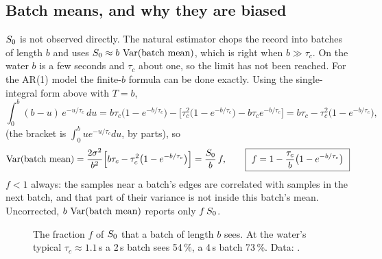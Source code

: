 \subsection{Batch means, and why they are biased}

$S_0$ is not observed directly. The natural estimator chops the record into
batches of length $b$ and uses $S_0 \approx b\,\operatorname{Var}(\text{batch mean})$, which
is right when $b \gg \tau_c$. On the water $b$ is a few seconds and $\tau_c$ about
one, so the limit has not been reached. For the AR(1) model the finite-$b$ formula
can be done exactly. Using the single-integral form above with $T=b$,
\[
  \int_0^b (b-u)\,e^{-u/\tau_c}\,du
  = b\tau_c\big(1-e^{-b/\tau_c}\big) - \Big[\tau_c^2\big(1-e^{-b/\tau_c}\big) - b\tau_c e^{-b/\tau_c}\Big]
  = b\tau_c - \tau_c^2\big(1-e^{-b/\tau_c}\big),
\]
(the bracket is $\int_0^b u e^{-u/\tau_c}du$, by parts), so
\[
  \Var(\text{batch mean}) = \frac{2\sigma^2}{b^2}\Big[b\tau_c - \tau_c^2\big(1-e^{-b/\tau_c}\big)\Big]
  = \frac{\Szero}{b}\,f,\qquad
  \boxed{\ f = 1 - \frac{\tau_c}{b}\big(1 - e^{-b/\tau_c}\big)\ }
\]
$f < 1$ always: the samples near a batch's edges are correlated with samples in
the next batch, and that part of their variance is not inside this batch's
mean. Uncorrected, $b\,\operatorname{Var}(\text{batch mean})$ reports only $f\,S_0$.

\begin{figure}[ht]
\centering
{}
\caption{The fraction $f$ of $S_0$ that a batch of length $b$ sees. At the
water's typical $\tau_c\approx1.1$\,s a 2\,s batch sees 54\,\%, a 4\,s batch
73\,\%. Data: .}
\label{fig:cond-f}
\end{figure}


